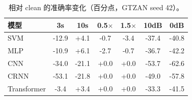 \begin{table}[H]
\centering\small
\caption{相对 clean 的准确率变化（百分点，GTZAN seed 42）。}
\label{tab:robust-delta}
\begin{tabular}{lcccccc}
\toprule
模型 & 3s & 10s & 0.5$\times$ & 1.5$\times$ & 10dB & 0dB\\
\midrule
SVM & -12.9 & +4.1 & -0.7 & -3.4 & -37.4 & -40.8\\
MLP & -10.9 & +6.1 & -2.7 & -0.7 & -36.7 & -42.2\\
CNN & -34.0 & -21.1 & +0.0 & +0.0 & -53.7 & -62.6\\
CRNN & -53.1 & -21.8 & +0.0 & +0.0 & -49.0 & -57.8\\
Transformer & -3.4 & +3.4 & +0.0 & +0.0 & -33.3 & -41.5\\
\bottomrule
\end{tabular}
\end{table}
